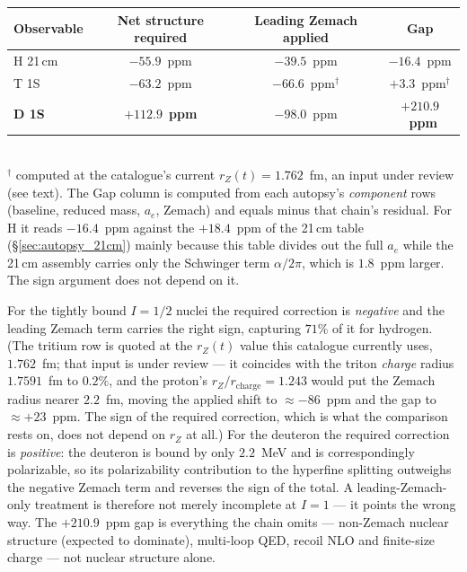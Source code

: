 \documentclass[11pt]{article}
\begin{document}
\begin{center}
\begin{tabular}{lccc}
\toprule
Observable & Net structure required & Leading Zemach applied & Gap \\
\midrule
H 21\,cm & $-55.9$~ppm & $-39.5$~ppm & $-16.4$~ppm \\
T 1S     & $-63.2$~ppm & $-66.6$~ppm$^{\dagger}$ & $+3.3$~ppm$^{\dagger}$ \\
\textbf{D 1S} & $\mathbf{+112.9}$~\textbf{ppm} & $-98.0$~ppm &
$\mathbf{+210.9}$~\textbf{ppm} \\
\bottomrule
\end{tabular}
\\[2pt]
{\footnotesize $^{\dagger}$ computed at the catalogue's current
$r_Z(t) = 1.762$~fm, an input under review (see text).
The Gap column is computed from each autopsy's \emph{component} rows
(baseline, reduced mass, $a_e$, Zemach) and equals minus that chain's
residual.  For H it reads $-16.4$~ppm against the $+18.4$~ppm of the
21\,cm table (\S\ref{sec:autopsy_21cm}) mainly because this table divides out
the full $a_e$ while the 21\,cm assembly carries only the Schwinger term
$\alpha/2\pi$, which is $1.8$~ppm larger.  The sign argument does not
depend on it.}
\end{center}

For the tightly bound $I = 1/2$ nuclei the required correction is
\emph{negative} and the leading Zemach term carries the right sign,
capturing $71\%$ of it for hydrogen.  (The tritium row is quoted at the
$r_Z(t)$ value this catalogue currently uses, $1.762$~fm; that input is
under review --- it coincides with the triton \emph{charge} radius
$1.7591$~fm to $0.2\%$, and the proton's $r_Z/r_\text{charge} = 1.243$
would put the Zemach radius nearer $2.2$~fm, moving the applied shift to
$\approx -86$~ppm and the gap to $\approx +23$~ppm.  The sign of the
required correction, which is what the comparison rests on, does not
depend on $r_Z$ at all.)  For the deuteron the required
correction is \emph{positive}: the deuteron is bound by only
$2.2$~MeV and is correspondingly polarizable, so its polarizability
contribution to the hyperfine splitting outweighs the negative Zemach
term and reverses the sign of the total.  A leading-Zemach-only
treatment is therefore not merely incomplete at $I = 1$ --- it points
the wrong way.  The $+210.9$~ppm gap is everything the chain omits ---
non-Zemach nuclear structure (expected to dominate), multi-loop QED,
recoil NLO and finite-size charge --- not nuclear structure alone.
\end{document}
